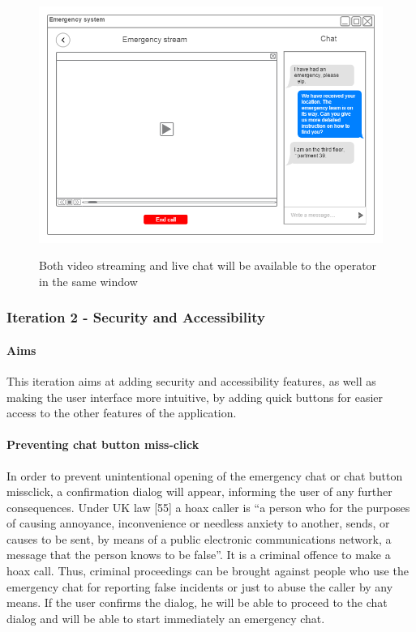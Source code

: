 \documentclass{article}
\begin{document}
	\begin{figure}[H]
		\centering
		\includegraphics[width=1\textwidth]{"ChatIteration1/backend_video_call (1)"}
		
		Both video streaming and live chat will be available to the operator in the same window
	\end{figure}
\pagebreak
		\subsubsection{Iteration 2 - Security and Accessibility}
			\paragraph{Aims}
			This iteration aims at adding security and accessibility features, as well as making the user interface more intuitive, by adding quick buttons for easier access to the other features of the application.

	\paragraph{Preventing chat button miss-click}
	In order to prevent unintentional opening of the emergency chat or chat button missclick, a confirmation dialog will appear, informing the user of any further consequences. Under UK law [55] a hoax caller is “a person who for the purposes of causing annoyance, inconvenience or needless anxiety to another, sends, or causes to be sent, by means of a public electronic communications network, a message that the person knows to be false”. It is a criminal offence to make a hoax call. Thus, criminal proceedings can be brought against people who use the emergency chat for reporting false incidents or just to abuse the caller by any means. If the user confirms the dialog, he will be able to proceed to the chat dialog and will be able to start immediately an emergency chat.
\end{document}
